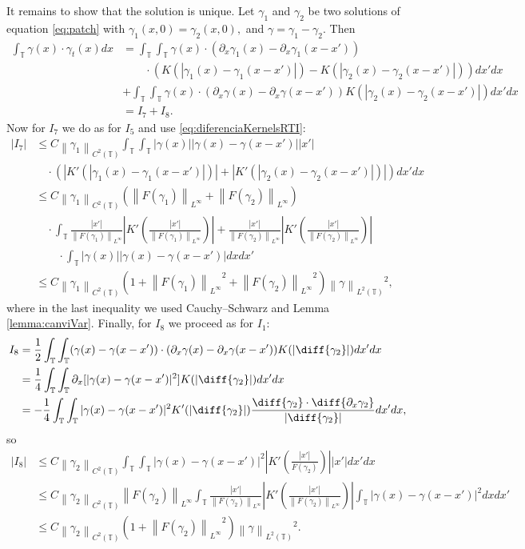 \documentclass[a4paper]{amsart}
\theoremstyle{definition}
\newcommand{\T}{\ensuremath{\mathbb{T}}}
\newcommand{\Np}[2][\infty]{\ensuremath{\left\|#2\right\|_{L^#1}}}
\newcommand{\Lp}[2][2]{\ensuremath{\left\|#2\right\|_{L^#1(\T)}}}
\newcommand{\Ck}[2][2]{\ensuremath{\left\|#2\right\|_{C^#1(\T)}}}
\newcommand{\intTT}{\ensuremath{\int_\T\int_\T}}
\begin{document}
    It remains to show that the solution is unique. Let $\gamma_1$ and $\gamma_2$ be two solutions of equation \eqref{eq:patch} with $\gamma_1(x,0)=\gamma_2(x,0),$ and $\gamma=\gamma_1-\gamma_2.$ Then 
    \begin{align*}
        \int_\T \gamma(x)\cdot\gamma_t(x)dx&= \int_\T\int_\T \gamma(x)\cdot (\partial_x\gamma_1(x)-\partial_x\gamma_1(x-x'))\\&\qquad\cdot(K(|\gamma_1(x)-\gamma_1(x-x')|)-K(|\gamma_2(x)-\gamma_2(x-x')|)) dx'dx\\ 
        &+ \int_\T\int_\T \gamma(x)\cdot (\partial_x\gamma(x)-\partial_x\gamma(x-x')) K(|\gamma_2(x)-\gamma_2(x-x')|)dx'dx\\
        &=I_7+I_8.
    \end{align*}
    Now for $I_7$ we do as for $I_5$ and use \eqref{eq:diferenciaKernelsRTI}:
    \begin{align*}
        |I_7|&\leq C\Ck{\gamma_1}\intTT |\gamma(x)||\gamma(x)-\gamma(x-x')| |x'|\\&\quad\cdot (|K'(|\gamma_1(x)-\gamma_1(x-x')|)|+|K'(|\gamma_2(x)-\gamma_2(x-x')|)|)dx'dx\\
        & \leq C \Ck{\gamma_1} (\Np{F(\gamma_1)}+\Np{F(\gamma_2)}) \\ &\quad\cdot \int_\T \frac{|x'|}{\Np{F(\gamma_1)}}\left|K'\left(\frac{|x'|}{\Np{F(\gamma_1)}}\right)\right|+\frac{|x'|}{\Np{F(\gamma_2)}}\left|K'\left(\frac{|x'|}{\Np{F(\gamma_2)}}\right)\right| \\&\qquad\cdot\int_\T |\gamma(x)||\gamma(x)-\gamma(x-x')|dxdx'\\
        &\leq C \Ck{\gamma_1} (1+\Np{F(\gamma_1)}^2+\Np{F(\gamma_2)}^2)\Lp{\gamma}^2,
    \end{align*}
    where in the last inequality we used Cauchy--Schwarz and Lemma \ref{lemma:canviVar}. Finally, for $I_8$ we proceed as for $I_1$: 
    \begin{align*}
        I_8&= \frac{1}{2} \int_\T\int_\T (\gamma(x)-\gamma(x-x'))\cdot(\partial_x\gamma(x)-\partial_x\gamma(x-x'))K(|\diff{\gamma_2}|) dx'dx\\
        &= \frac{1}{4} \int_\T\int_\T \partial_x[|\gamma(x)-\gamma(x-x')|^2]K(|\diff{\gamma_2}|) dx'dx\\
        &= -\frac{1}{4} \int_\T\int_\T |\gamma(x)-\gamma(x-x')|^2 K'(|\diff{\gamma_2}|) \frac{\diff{\gamma_2}\cdot\diff{\partial_x\gamma_2}}{|\diff{\gamma_2}|} dx'dx,
    \end{align*}
    so
    \begin{align*}
        |I_8|&\leq C \Ck{\gamma_2} \int_\T\int_\T |\gamma(x)-\gamma(x-x')|^2\left|K'\left(\frac{|x'|}{F(\gamma_2)}\right)\right||x'|dx'dx\\
        &\leq C \Ck{\gamma_2} \Np{F(\gamma_2)}\int_\T \frac{|x'|}{\Np{F(\gamma_2)}}\left|K'\left(\frac{|x'|}{\Np{F(\gamma_2)}}\right)\right|\int_\T |\gamma(x)-\gamma(x-x')|^2 dxdx' \\
        &\leq C \Ck{\gamma_2} (1+\Np{F(\gamma_2)}^2) \Lp{\gamma}^2 .
    \end{align*}
\end{document}
